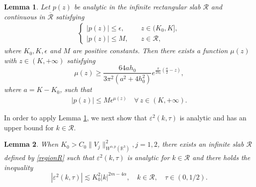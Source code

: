 \documentclass[reqno, 12pt]{amsart}
\newtheorem{Le}{Lemma}[section]
\numberwithin{equation}{section}
\begin{document}
\begin{Le}\label{Lem4.6}
	Let $p(z)$ be analytic in the infinite rectangular slab $\mathcal{R}$
	and continuous in $\overline{\mathcal{R}}$ satisfying
	\begin{align*}
		\begin{cases}
			|p(z)|\leq \epsilon, &\quad z\in (K_0, K],\\
			|p(z)|\leq M, &\quad z\in \mathcal{R},
		\end{cases}
	\end{align*}
	where $K_0, K, \epsilon$ and $M$ are positive constants. Then there exists a function $\mu(z)$ with $z\in (K, +\infty)$ satisfying 
	\begin{equation*}
		\mu(z) \geq \frac{64ah_0}{3\pi^2(a^2 + 4h_0^2)} e^{\frac{\pi}{2h_0}(\frac{a}{2} - z)},
	\end{equation*}
	where $a = K - K_0$, such that
	\begin{align*}
		|p(z)|\leq M\epsilon^{\mu(z)}\quad \forall\, z\in (K, +\infty).
	\end{align*}
\end{Le}
In order to apply Lemma \ref{Lem4.6}, we next show that $\varepsilon^2(k, \tau)$ is analytic and has an upper bound for $k \in \mathcal{R}$.
\begin{Le}\label{Lem4.7}
	When $K_0>C_0\|V_j\|^2_{W^{\alpha,p}(\mathbb R^3)}, j=1, 2$, there exists an infinite slab $\mathcal{R}$ defined by \eqref{regionR} such that $\varepsilon^2(k,\tau)$ is analytic for $k \in \mathcal{R}$ and there holds the inequality \[
	|\varepsilon^2(k, \tau)| \lesssim K_0^2|k|^{2m-4\alpha},\quad k \in \mathcal{R}, \quad\tau \in (0,1/2).
	\] 
\end{Le}
\end{document}
